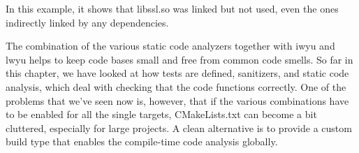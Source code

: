 In this example, it shows that libssl.so was linked but not used, even the ones indirectly linked by any dependencies.

The combination of the various static code analyzers together with iwyu and lwyu helps to keep code bases small and free from common code smells. So far in this chapter, we have looked at how tests are defined, sanitizers, and static code analysis, which deal with checking that the code functions correctly. One of the problems that we've seen now is, however, that if the various combinations have to be enabled for all the single targets, CMakeLists.txt can become a bit cluttered, especially for large projects. A clean alternative is to provide a custom build type that enables the compile-time code analysis globally.













